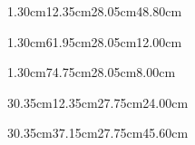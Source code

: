 \documentclass{tehran-poster}
\begin{document}
\PosterBackground
\PosterHeader

  {1.30cm}{12.35cm}{28.05cm}{48.80cm}{\ResultsContent}

  {1.30cm}{61.95cm}{28.05cm}{12.00cm}{\ConclusionContent}

  {1.30cm}{74.75cm}{28.05cm}{8.00cm}{\ReferencesContent}

  {30.35cm}{12.35cm}{27.75cm}{24.00cm}{\IntroductionContent}

  {30.35cm}{37.15cm}{27.75cm}{45.60cm}{\MethodContent}

\null
\end{document}

